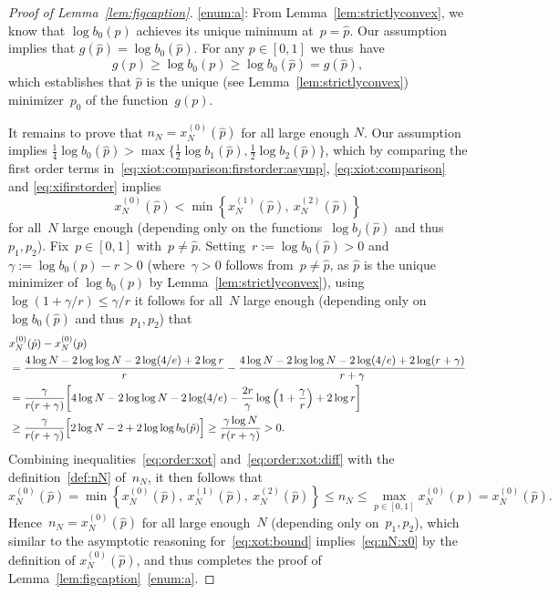 \documentclass{article}
\newcommand\lrpar[1]{\left(#1\right)}
\newcommand{\xone}{x^{(1)}}
\newcommand{\xtwo}{x^{(2)}}
\newcommand{\xot}{x^{(0)}}
\newcommand{\ps}{\hat{p}}
\newcommand\Bigsqpar[1]{\Bigl[#1\Bigr]}
\newcommand\biggsqpar[1]{\biggl[#1\biggr]}
\begin{document}
\begin{proof}[Proof of Lemma~\ref{lem:figcaption}]
\ref{enum:a}: From Lemma~\ref{lem:strictlyconvex}, we know that $\log b_0(p)$ achieves its unique minimum at~$p=\ps$.
Our assumption implies that $g(\ps) = \log b_0(\ps)$. 
For any $p\in[0,1]$ we thus~have
\begin{equation*}g(p) \ge \log b_0(p)\ge \log b_0(\ps)= g(\ps),
\end{equation*}  
which establishes that $\ps$ is the unique (see Lemma~\ref{lem:strictlyconvex}) minimizer~$p_0$ of the function~$g(p)$.

It remains to prove that $n_N=\xot_N(\ps)$ for all large enough $N$. 
Our assumption implies $\tfrac{1}{4}
\log b_0(\ps)>\max\{\tfrac{1}{2}\log b_1(\ps), \tfrac{1}{2}\log b_2(\ps)\}$, 
which by comparing the first order terms in~\eqref{eq:xiot:comparison:firstorder:asymp}, \eqref{eq:xiot:comparison} and \eqref{eq:xifirstorder} implies 
\begin{equation}\label{eq:order:xot}
\xot_N(\ps)<\min\left\{\xone_N(\ps), \: \xtwo_N(\ps)\right\}
\end{equation}
for all~$N$ large enough (depending only on the functions~$\log b_j(\ps)$ and thus~$p_1,p_2$). 
Fix~$p\in [0,1]$ with~$p \neq \ps$. Setting~$r:=\log b_0(\ps) > 0$ and $\gamma:=\log b_0(p)-r >0$ 
(where~$\gamma > 0$ follows from~$p \neq \ps$, as $\ps$ is the unique minimizer of $\log b_0(p)$ by Lemma~\ref{lem:strictlyconvex}), 
using~${\log(1+\gamma/r) \le \gamma/r}$ it follows for all~$N$ large enough (depending only on~$\log b_0(\ps)$ and thus~$p_1,p_2$) that 
\begin{equation}\label{eq:order:xot:diff}
\begin{split}
        &\xot_N(\ps)-\xot_N(p)\\
        & = \frac{4\log N-2\log\log N-2\log(4/e)+2\log r}{r} - \frac{4\log N-2\log\log N-2\log(4/e)+2\log (r+\gamma)}{r+\gamma}\\
        &=\frac{\gamma}{r(r+\gamma)} \biggsqpar{4\log N-2\log\log N -2\log(4/e)-\frac{2r}{\gamma}\log\lrpar{1+\frac{\gamma}{r}} + 2\log r}\\
        & \ge \frac{\gamma}{r(r+\gamma)} \Bigsqpar{2\log N-2+2 \log \log b_0(\ps)} \ge \frac{\gamma \log N}{r(r+\gamma)} > 0 .
\end{split}
\end{equation}
Combining inequalities~\eqref{eq:order:xot} and~\eqref{eq:order:xot:diff}
with the definition~\eqref{def:nN} of~$n_N$, it then follows that
\[
\xot_N(\ps) = \min\left\{\xot_N(\ps), \: \xone_N(\ps), \: \xtwo_N(\ps) \right\} \le n_N \le \max_{p\in [0,1]} \xot_N(p) = \xot_N(\ps) .
\]
Hence~$n_N=\xot_N(\ps)$ for all large enough~$N$ (depending only on~$p_1,p_2$), 
which similar to the asymptotic reasoning for~\eqref{eq:xot:bound} implies~\eqref{eq:nN:x0} by the definition of $\xot_N(\ps)$, 
and thus completes the proof of Lemma~\ref{lem:figcaption}~\ref{enum:a}. 
    

\end{proof}
\end{document}
